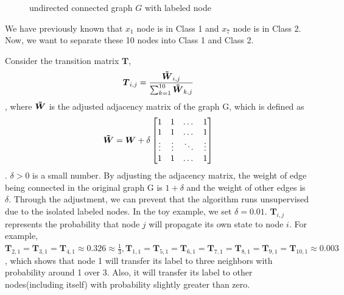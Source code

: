\documentclass{article}
\begin{document}
\begin{figure}[ht!]
        \centering
        \caption{undirected connected graph $G$ with labeled node}
    \end{figure}

We have previously known that $x_1$ node is in Class 1 and $x_7$ node is in Class 2. Now, we want to separate these 10 nodes into Class 1 and Class 2.

Consider the transition matrix $\boldsymbol{T}$,
$$\boldsymbol{T}_{i,j} = \frac{\boldsymbol{\Tilde{W}}_{i,j}}{\sum_{k=1}^{10} \boldsymbol{\Tilde{W}}_{k,j}}$$,
where $\boldsymbol{\Tilde{W}}$ is the adjusted adjacency matrix of the graph G, which is defined as 
$$\boldsymbol{\Tilde{W}} = \boldsymbol{W} + \delta
\begin{bmatrix}
    1 & 1 & \dots  & 1 \\
    1 & 1 & \dots  & 1 \\
    \vdots & \vdots & \ddots & \vdots \\
    1 & 1 &  \dots  &  1
\end{bmatrix}$$. $\delta > 0$ is a small number. By adjusting the adjacency matrix, the weight of edge being connected in the original graph G is $1+\delta$ and the weight of other edges is $\delta$. Through the adjustment, we can prevent that the algorithm runs unsupervised due to the isolated labeled nodes. In the toy example, we set $\delta=0.01$.  
$\boldsymbol{T}_{i,j}$ represents the probability that node $j$ will propagate its own state to node $i$. For example, $\boldsymbol{T}_{2,1} = \boldsymbol{T}_{3,1} = \boldsymbol{T}_{4,1} \approx 0.326 \approx \frac{1}{3}, \boldsymbol{T}_{1,1} = \boldsymbol{T}_{5,1} = \boldsymbol{T}_{6,1} = \boldsymbol{T}_{7,1}= \boldsymbol{T}_{8,1}= \boldsymbol{T}_{9,1}= \boldsymbol{T}_{10,1}\approx 0.003$, which shows that node 1 will transfer its label to three neighbors with probability around 1 over 3. Also, it will transfer its label to other nodes(including itself) with probability slightly greater than zero.
\end{document}
